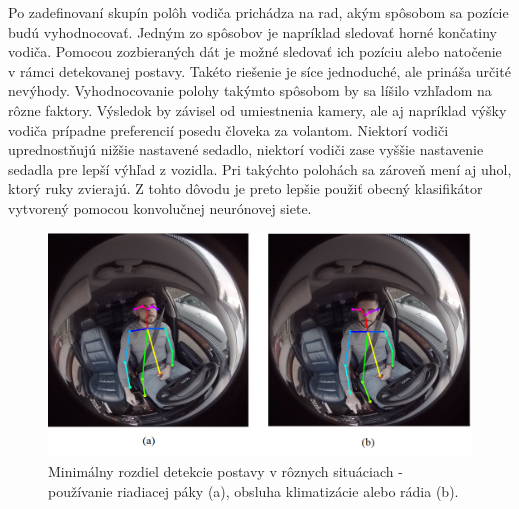 \documentclass[slovak,master,dept460,male,cpp,cpdeclaration]{diploma}
\begin{document}
Po zadefinovaní skupín polôh vodiča prichádza na rad, akým spôsobom sa pozície budú vyhodnocovať. Jedným zo spôsobov je  napríklad  sledovať horné končatiny vodiča. Pomocou zozbieraných dát je možné sledovať ich pozíciu alebo natočenie v rámci detekovanej postavy. Takéto riešenie  je síce jednoduché, ale prináša  určité nevýhody. Vyhodnocovanie  polohy takýmto spôsobom by sa líšilo vzhľadom na rôzne faktory. Výsledok by závisel od umiestnenia kamery, ale aj napríklad výšky vodiča prípadne preferencií posedu človeka za volantom. Niektorí vodiči uprednostňujú nižšie nastavené sedadlo, niektorí vodiči zase vyššie nastavenie sedadla pre lepší výhľad z vozidla. Pri takýchto polohách sa zároveň mení aj uhol, ktorý ruky zvierajú. Z tohto dôvodu je preto lepšie použiť obecný klasifikátor vytvorený pomocou konvolučnej neurónovej siete.

\begin{figure}[H]
	\centering
	\includegraphics[width=1\textwidth]{Figures/radioUsage.png}
	\caption{Minimálny rozdiel detekcie postavy v rôznych situáciach - používanie riadiacej páky (a), obsluha klimatizácie alebo rádia (b).}
	\label{fig:radioUsage}
\end{figure}
\end{document}
